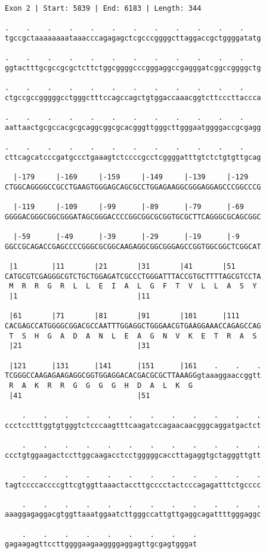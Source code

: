 \documentclass{article}
\begin{document}
\newpage
\begin{Verbatim}
Exon 2 | Start: 5839 | End: 6183 | Length: 344
 
.    .    .    .    .    .    .    .    .    .    .    .    
tgccgctaaaaaaaataaacccagagagctcgcccggggcttaggaccgctggggatatg
  
.    .    .    .    .    .    .    .    .    .    .    .    
ggtactttgcgccgcgctcttctggcggggcccgggaggccgagggatcggccggggctg
  
.    .    .    .    .    .    .    .    .    .    .    .    
ctgccgccgggggcctgggctttccagccagctgtggaccaaacggtcttcccttaccca
  
.    .    .    .    .    .    .    .    .    .    .    .    
aattaactgcgccacgcgcaggcggcgcacgggttgggcttgggaatggggaccgcgagg
  
.    .    .    .    .    .    .    .    .    .    .    .    
cttcagcatcccgatgccctgaaagtctccccgcctcggggatttgtctctgtgttgcag
  
  |-179     |-169     |-159     |-149     |-139     |-129   
CTGGCAGGGGCCGCCTGAAGTGGGAGCAGCGCCTGGAGAAGGCGGGAGGAGCCCGGCCCG
  
  |-119     |-109     |-99      |-89      |-79      |-69    
GGGGACGGGCGGCGGGATAGCGGGACCCCGGCGGCGCGGTGCGCTTCAGGGCGCAGCGGC
  
  |-59      |-49      |-39      |-29      |-19      |-9     
GGCCGCAGACCGAGCCCCGGGCGCGGCAAGAGGCGGCGGGAGCCGGTGGCGGCTCGGCAT
  
 |1        |11       |21       |31       |41       |51      
CATGCGTCGAGGGCGTCTGCTGGAGATCGCCCTGGGATTTACCGTGCTTTTAGCGTCCTA
 M  R  R  G  R  L  L  E  I  A  L  G  F  T  V  L  L  A  S  Y 
 |1                            |11                          
  
 |61       |71       |81       |91       |101      |111     
CACGAGCCATGGGGCGGACGCCAATTTGGAGGCTGGGAACGTGAAGGAAACCAGAGCCAG
 T  S  H  G  A  D  A  N  L  E  A  G  N  V  K  E  T  R  A  S 
 |21                           |31                          
  
 |121      |131      |141      |151      |161    .    .    .
TCGGGCCAAGAGAAGAGGCGGTGGAGGACACGACGCGCTTAAAGGgtaaaggaaccggtt
 R  A  K  R  R  G  G  G  G  H  D  A  L  K  G                
 |41                           |51                          
  
    .    .    .    .    .    .    .    .    .    .    .    .
ccctcctttggtgtgggtctcccaagtttcaagatccagaacaacgggcaggatgactct
  
    .    .    .    .    .    .    .    .    .    .    .    .
ccctgtggaagactccttggcaagacctcctgggggcaccttagaggtgctagggttgtt
  
    .    .    .    .    .    .    .    .    .    .    .    .
tagtccccaccccgttcgtggttaaactaccttgcccctactcccagagatttctgcccc
  
    .    .    .    .    .    .    .    .    .    .    .    .
aaaggagaggacgtggttaaatggaatcttgggccattgttgaggcagattttgggaggc
  
    .    .    .    .    .    .    .    .    .
gagaagagttccttggggaagaaggggaggagttgcgagtgggat
\end{Verbatim}
\end{document}
